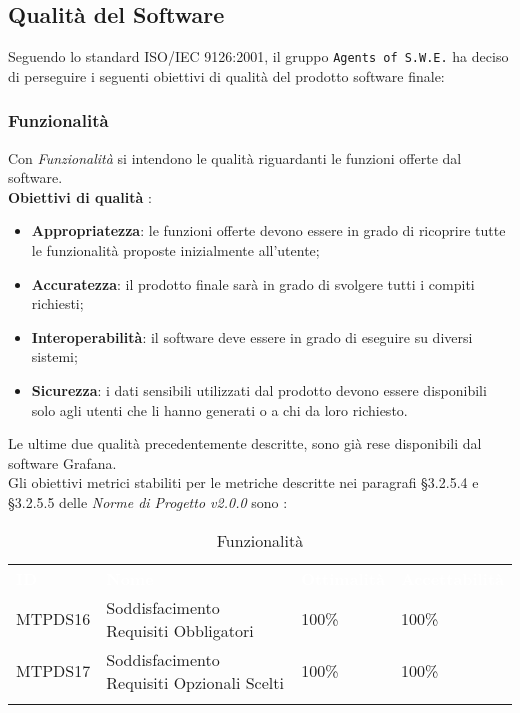 \subsection{Qualità del Software}

Seguendo lo standard ISO/IEC 9126:2001, il gruppo \texttt{Agents of S.W.E.} ha deciso di perseguire i seguenti obiettivi di qualità del prodotto software finale:


\subsubsection{Funzionalità}

Con \textit{Funzionalità} si intendono le qualità riguardanti le funzioni offerte dal software.\\
\textbf{Obiettivi di qualità} :
\begin{itemize}
	\item \textbf{Appropriatezza}: le funzioni offerte devono essere in grado di ricoprire tutte le funzionalità proposte inizialmente all'utente;
	\item \textbf{Accuratezza}: il prodotto finale sarà in grado di svolgere tutti i compiti richiesti;
	\item \textbf{Interoperabilità}: il software deve essere in grado di eseguire su diversi sistemi;
	\item \textbf{Sicurezza}: i dati sensibili utilizzati dal prodotto devono essere disponibili solo agli utenti che li hanno generati o a chi da loro richiesto. 
\end{itemize}
Le ultime due qualità precedentemente descritte, sono già rese disponibili dal software Grafana. \\

Gli obiettivi metrici stabiliti per le metriche descritte nei paragrafi §3.2.5.4 e §3.2.5.5 delle \textit{Norme di Progetto v2.0.0} sono : 

\begin{longtable}{|C{.15\textwidth}|C{.24\textwidth}|C{.24\textwidth}|C{.24\textwidth}|}
\hline
{}\textbf{\textcolor{white}{ID}} & \textbf{\textcolor{white}{Nome}} & \textbf{\textcolor{white}{Ottimalità}} & \textbf{\textcolor{white}{Accettabilità}}\\
MTPDS16 & Soddisfacimento Requisiti Obbligatori & 100\% & 100\%\\
\hline
{}MTPDS17 & Soddisfacimento Requisiti Opzionali Scelti & 100\% & 100\% \\ 
\hline
\caption{Funzionalità}
\label{Funzionalità}
\end{longtable}

